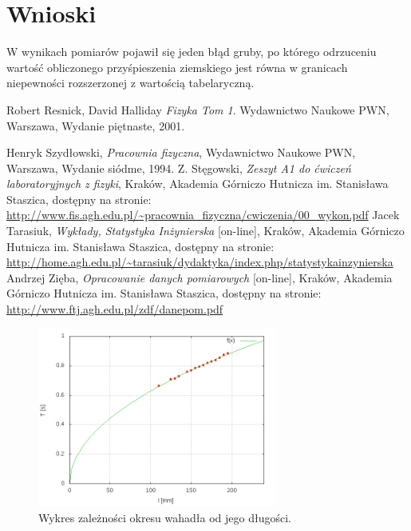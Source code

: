 \documentclass{article}
\begin{document}
\section{Wnioski}
	W wynikach pomiarów pojawił się jeden błąd gruby, po którego odrzuceniu wartość obliczonego przyśpieszenia ziemskiego jest równa w granicach niepewności rozszerzonej z wartością tabelaryczną. 
	



\begin{thebibliography}{9}
 
  Robert Resnick, David Halliday
  \emph{Fizyka Tom 1}.
    Wydawnictwo Naukowe PWN, Warszawa,
  Wydanie piętnaste,
  2001.


 Henryk Szydłowski,
 \emph{Pracownia fizyczna}, Wydawnictwo Naukowe PWN, Warszawa, Wydanie siódme, 1994.
  Z. Stęgowski,
  \emph{Zeszyt A1 do ćwiczeń laboratoryjnych z fizyki}, Kraków, Akademia Górniczo Hutnicza im. Stanisława Staszica, dostępny na stronie:\\
  \url{http://www.fis.agh.edu.pl/~pracownia_fizyczna/cwiczenia/00_wykon.pdf}
 Jacek Tarasiuk,
 \emph{Wykłady, Statystyka Inżynierska} [on-line], Kraków, Akademia Górniczo Hutnicza im. Stanisława Staszica, dostępny na stronie:\\
  \url{http://home.agh.edu.pl/~tarasiuk/dydaktyka/index.php/statystykainzynierska}
 Andrzej Zięba,
 \emph{Opracowanie danych pomiarowych} [on-line], Kraków, Akademia Górniczo Hutnicza im. Stanisława Staszica, dostępny na stronie:\\
  \url{http://www.ftj.agh.edu.pl/zdf/danepom.pdf}
  \label{statystyka}



\end{thebibliography}
\vspace{2cm}
\newpage
	\begin{figure}[p]
		\centering
		\includegraphics[width=0.7\textwidth]{wykres_T/wykres1.png}
		\caption{Wykres zależności okresu wahadła od jego długości.}
		\label{wykres1}
	\end{figure}
	
\end{document}
